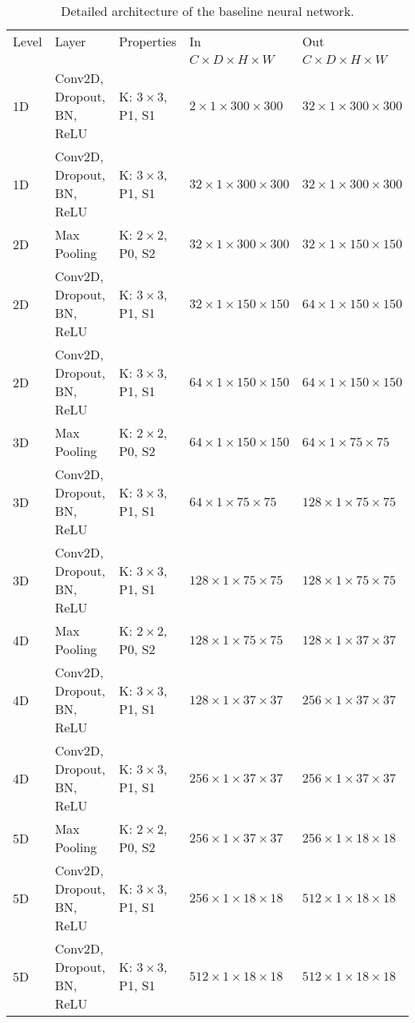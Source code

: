 \begin{sidewaystable}[htbp]
   \centering
   \caption[Architecture of Base]{Detailed architecture of the baseline neural network.}
   \begin{tabular}{l*{4}{l}}
      \toprule
      Level	& Layer						& Properties 					& In 									& Out	\\
      		&							&								& $C \times D \times H \times W$		& $C \times D \times H \times W$		\\
      \midrule
      1D	& Conv2D, Dropout, BN, ReLU & K: $3 \times 3$, P1, S1		& $2 \times 1 \times 300 \times 300$	& $32 \times 1 \times 300 \times 300$	\\
      1D	& Conv2D, Dropout, BN, ReLU & K: $3 \times 3$, P1, S1		& $32 \times 1 \times 300 \times 300$	& $32 \times 1 \times 300 \times 300$	\\
      2D	& Max Pooling				& K: $2 \times 2$, P0, S2		& $32 \times 1 \times 300 \times 300$	& $32 \times 1 \times 150 \times 150$	\\
      2D	& Conv2D, Dropout, BN, ReLU & K: $3 \times 3$, P1, S1		& $32 \times 1 \times 150 \times 150$	& $64 \times 1 \times 150 \times 150$	\\
      2D	& Conv2D, Dropout, BN, ReLU & K: $3 \times 3$, P1, S1		& $64 \times 1 \times 150 \times 150$	& $64 \times 1 \times 150 \times 150$	\\
      3D	& Max Pooling				& K: $2 \times 2$, P0, S2		& $64 \times 1 \times 150 \times 150$	& $64 \times 1 \times 75 \times 75$		\\
      3D	& Conv2D, Dropout, BN, ReLU & K: $3 \times 3$, P1, S1		& $64 \times 1 \times 75 \times 75$		& $128 \times 1 \times 75 \times 75$	\\
      3D	& Conv2D, Dropout, BN, ReLU & K: $3 \times 3$, P1, S1		& $128 \times 1 \times 75 \times 75$	& $128 \times 1 \times 75 \times 75$	\\
      4D	& Max Pooling				& K: $2 \times 2$, P0, S2		& $128 \times 1 \times 75 \times 75$	& $128 \times 1 \times 37 \times 37$	\\
      4D	& Conv2D, Dropout, BN, ReLU & K: $3 \times 3$, P1, S1		& $128 \times 1 \times 37 \times 37$	& $256 \times 1 \times 37 \times 37$	\\
      4D	& Conv2D, Dropout, BN, ReLU & K: $3 \times 3$, P1, S1		& $256 \times 1 \times 37 \times 37$	& $256 \times 1 \times 37 \times 37$	\\
      5D	& Max Pooling				& K: $2 \times 2$, P0, S2		& $256 \times 1 \times 37 \times 37$	& $256 \times 1 \times 18 \times 18$	\\
      5D	& Conv2D, Dropout, BN, ReLU & K: $3 \times 3$, P1, S1		& $256 \times 1 \times 18 \times 18$	& $512 \times 1 \times 18 \times 18$	\\
      5D	& Conv2D, Dropout, BN, ReLU & K: $3 \times 3$, P1, S1		& $512 \times 1 \times 18 \times 18$	& $512 \times 1 \times 18 \times 18$	\\
      

\end{tabular}
\end{sidewaystable}
